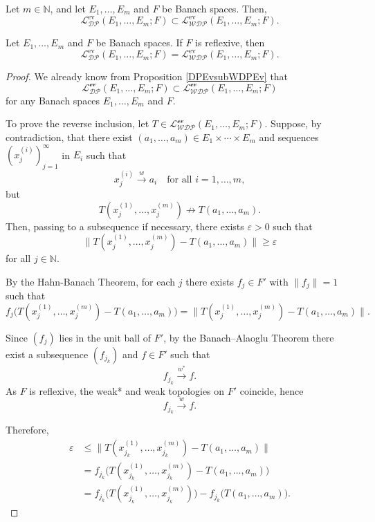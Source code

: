 \documentclass[10pt,a4paper]{amsart}
\begin{document}
\begin{proposition}\label{DPEvsubWDPEv}
	Let $m \in \mathbb{N}$, and let $E_1,\dots,E_m$ and $F$ be Banach spaces. Then,
	\[
	\mathcal{L_{DP}^{\mathrm{ev}}}(E_1,\dots,E_m;F)
	\subset
	\mathcal{L_{WDP}^{\mathrm{ev}}}(E_1,\dots,E_m;F).
	\]
\end{proposition}

\begin{theorem}\label{WDP=WDP}
	Let $E_1,\dots,E_m$ and $F$ be Banach spaces. If $F$ is reflexive, then
	\[
	\mathcal{L_{DP}^{\mathrm{ev}}}(E_1,\dots,E_m;F)
	=
	\mathcal{L_{WDP}^{\mathrm{ev}}}(E_1,\dots,E_m;F).
	\]
\end{theorem}

\begin{proof}
	We already know from Proposition \ref{DPEvsubWDPEv} that
	\[
	\mathcal{L_{DP}^{\text{ev}}}(E_1,\dots, E_m; F) \subset \mathcal{L_{WDP}^{\text{ev}}}(E_1,\dots, E_m; F)
	\]
	for any Banach spaces $E_1,\dots, E_m$ and $F$.
	
	To prove the reverse inclusion, let $T \in \mathcal{L_{WDP}^{\text{ev}}}(E_1,\dots, E_m; F)$. Suppose, by contradiction, that there exist $(a_1,\dots, a_m) \in E_1 \times \cdots \times E_m$ and sequences $(x_j^{(i)})_{j=1}^\infty$ in $E_i$ such that
	\[
	x_j^{(i)} \overset{w}{\longrightarrow} a_i \quad \text{for all } i=1,\dots,m,
	\]
	but
	\[
	T(x_j^{(1)},\dots, x_j^{(m)}) \nrightarrow T(a_1,\dots, a_m).
	\]
	Then, passing to a subsequence if necessary, there exists $\varepsilon > 0$ such that
	\[
	\|T(x_j^{(1)},\dots, x_j^{(m)}) - T(a_1,\dots, a_m)\| \ge \varepsilon
	\]
	for all $j \in \mathbb{N}$.
	
	By the Hahn-Banach Theorem, for each $j$ there exists $f_j \in F'$ with $\|f_j\| = 1$ such that
	\[
	f_j\big(T(x_j^{(1)},\dots, x_j^{(m)}) - T(a_1,\dots, a_m)\big)
	= \|T(x_j^{(1)},\dots, x_j^{(m)}) - T(a_1,\dots, a_m)\|.
	\]
	
	Since $(f_j)$ lies in the unit ball of $F'$, by the Banach--Alaoglu Theorem there exist a subsequence $(f_{j_k})$ and $f \in F'$ such that
	\[
	f_{j_k} \overset{w^*}{\longrightarrow} f.
	\]
	As $F$ is reflexive, the weak* and weak topologies on $F'$ coincide, hence
	\[
	f_{j_k} \overset{w}{\longrightarrow} f.
	\]
	
	Therefore,
	\begin{align*}
		\varepsilon 
		&\le \|T(x_{j_k}^{(1)},\dots, x_{j_k}^{(m)}) - T(a_1,\dots, a_m)\| \\
		&= f_{j_k}\big(T(x_{j_k}^{(1)},\dots, x_{j_k}^{(m)}) - T(a_1,\dots, a_m)\big) \\
		&= f_{j_k}\big(T(x_{j_k}^{(1)},\dots, x_{j_k}^{(m)})\big) - f_{j_k}\big(T(a_1,\dots, a_m)\big).
	\end{align*}
	

\end{proof}
\end{document}
